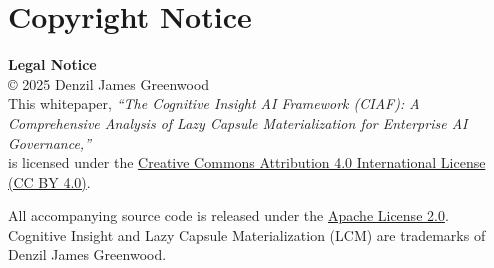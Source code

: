 \documentclass[12pt,a4paper]{article}
\begin{document}
\section*{Copyright Notice}

\begin{infobox}
\textbf{Legal Notice}\\
© 2025 Denzil James Greenwood \\
This whitepaper, \textit{``The Cognitive Insight AI Framework (CIAF): A Comprehensive Analysis of Lazy Capsule Materialization for Enterprise AI Governance,''} \\
is licensed under the \href{https://creativecommons.org/licenses/by/4.0/}{Creative Commons Attribution 4.0 International License (CC BY 4.0)}.

All accompanying source code is released under the \href{https://www.apache.org/licenses/LICENSE-2.0}{Apache License 2.0}. \\
Cognitive Insight\texttrademark{} and Lazy Capsule Materialization (LCM)\texttrademark{} are trademarks of Denzil James Greenwood.
\end{infobox}
\end{document}
